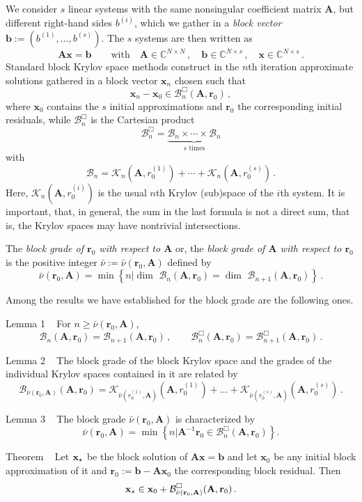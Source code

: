 \documentclass[twosided]{report}
\newcommand{\Cplex}{\mathbb{C}}
\newcommand{\calB}{{\mathcal B}}
\newcommand{\calBB}{{\mathcal B}^{\Box}}
\newcommand{\calK}{\mathcal{K}}
\newcommand{\bfA}{{\mathbf A}}
\newcommand{\bfb}{{\mathbf b}}
\newcommand{\bfr}{{\mathbf r}}
\newcommand{\bfx}{{\mathbf x}}
\newcommand{\bfxex}{{\mathbf x}_{\mbox{\scriptsize $\star$}}}
\newcommand{\Dim}{\mathop{\mathrm{dim\ }}}
\begin{document}
We consider $s$ linear systems with the same
nonsingular coefficient matrix $\bfA$, but different
right-hand sides $b^{(i)}$, which we gather in a
\textit{block vector}
$\bfb := (b^{(1)},\dots,b^{(s)})$.
The $s$ systems are then written as
$$
\bfA \bfx = \bfb \qquad
\text{with} \quad \bfA \in \Cplex^{N\times N}\,,
\quad \bfb \in
\Cplex^{N\times s}\,,\quad
\bfx \in \Cplex^{N\times s}\,.
$$
Standard block Krylov space methods
construct in the $n$th iteration approximate solutions
gathered in a block vector $\bfx_n$ chosen such that
$$
\bfx_n - \bfx_0 \in \calBB_n
(\bfA, \bfr_0) \,,
$$
where $\bfx_0$
contains the $s$ initial approximations and $\bfr_0$ the
corresponding initial residuals, while
$\calBB_n$ is the
Cartesian product
$$
\calBB_n = \underbrace{\calB_n
\times \cdots \times
\calB_n}_{s\text{ times}}
$$
with
$$
\calB_n = \calK_n (\bfA,
r_0^{(1)}) + \cdots + \calK_n
(\bfA, r_0^{(s)}) \,.
$$
Here, $\calK_n (\bfA, r_0^{(i)})$
is the
usual $n$th Krylov (sub)space of the $i$th system. It is
important, that, in general, the sum in the last formula is
not a direct sum, that is, the Krylov spaces may have
nontrivial intersections.

The \textit{block grade of\/
$\bfr_0$ with respect to\/ $\bfA$} or, the
\textit{block grade of\/ $\bfA$
with respect to\/ $\bfr_0$}
is the positive integer
$\bar\nu := \bar\nu(\bfr_0,\bfA)$
defined by
$$
\bar\nu(\bfr_0,\bfA) = \min \left\{n \big\vert
\Dim
\calB_n(\bfA, \bfr_0) =
\Dim
\calB_{n+1}(\bfA, \bfr_0)
\right\}\,.
$$

Among the results we have
established for the block grade are the following ones.


{\sc Lemma 1} ~
For $n \geq \bar\nu(\bfr_0,\bfA)$,
$$
\calB_n(\bfA, \bfr_0) =
\calB_{n+1}(\bfA, \bfr_0)\,,\qquad
\calBB_n(\bfA, \bfr_0) =
\calBB_{n+1}(\bfA, \bfr_0)\,.
$$


{\sc Lemma 2} ~
The block grade of the
block Krylov space and the grades of the individual Krylov
spaces contained in it are related by
$$
\calB_{\bar\nu(\bfr_0,\bfA)}(\bfA, \bfr_0) =
\calK_{\bar\nu(r_0^{(1)},\bfA)}(\bfA, r_0^{(1)})
+ \dots +
\calK_{\bar\nu(r_0^{(s)},\bfA)}(\bfA, r_0^{(s)})\,.
$$

{\sc Lemma 3} ~
The block grade $\bar\nu(\bfr_0,\bfA)$ is characterized by
$$
\bar\nu(\bfr_0,\bfA)
= \min\left\{ n \big\vert \bfA^{-1} \bfr_0 \in
\calBB_n(\bfA, \bfr_0) \right\}.
$$


{\sc Theorem} ~
Let $\bfxex$ be the block
solution of $\bfA\bfx = \bfb$ and let $\bfx_0$ be any
initial block approximation of it and
$\bfr_0 := \bfb - \bfA \bfx_0$
the corresponding block residual. Then
$$
\bfxex \in \bfx_0 +
\calBB_{\bar\nu(\bfr_0,\bfA)}(\bfA,\bfr_0)
\,.
$$
\end{document}
